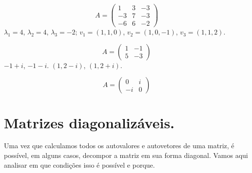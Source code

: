\begin{exemplo*}
   $$A =
   \begin{pmatrix}
      1 & 3 & -3\\
      -3 & 7 & -3\\
      -6 & 6 & -2
   \end{pmatrix}$$
   $\lambda_1=4$, $\lambda_2=4$, $\lambda_3=-2$; $v_1=(1,1,0)$, $v_2=(1,0,-1)$, $v_3=(1,1,2)$.
\end{exemplo*}

\begin{exemplo*}
   $$A = 
   \begin{pmatrix}
      1 & -1\\
      5 & -3
   \end{pmatrix}$$
   $-1+i$, $-1-i$. $(1,2-i)$, $(1,2+i)$.
\end{exemplo*}

\begin{exemplo*}
	$$A=\begin{pmatrix} 0 & i\\-i & 0\end{pmatrix}$$
\end{exemplo*}

\section{Matrizes diagonalizáveis.}

Uma vez que calculamos todos os autovalores e autovetores de uma matriz, é possível, em alguns casos, decompor a matriz em sua forma diagonal. Vamos aqui analisar em que condições isso é possível e porque.

